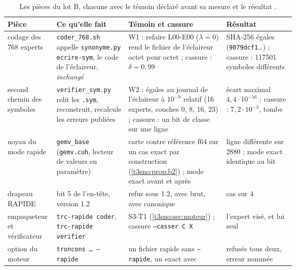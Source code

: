 \begin{table}[ht]
\centering\footnotesize
\caption[Les pièces du lot B et leurs témoins]{Les pièces du lot B, chacune avec le témoin déclaré avant sa mesure et le résultat \mes.}
\label{t3sno:tab:pieces}
\begin{tabularx}{\linewidth}{@{}>{\raggedright\arraybackslash}p{0.17\linewidth}>{\raggedright\arraybackslash}p{0.25\linewidth}>{\raggedright\arraybackslash}X>{\raggedright\arraybackslash}p{0.24\linewidth}@{}}
\toprule
Pièce & Ce qu'elle fait & Témoin et cassure & Résultat \\
\midrule
codage des 768 experts & \texttt{coder\_768.sh} appelle \texttt{synonyme.py ecrire-sym}, le code de l'éclaireur, \emph{inchangé} & W1 : refaire L00-E00 ($\lambda = 0$) rend le fichier de l'éclaireur octet pour octet ; cassure : $\delta = 0{,}99$ & SHA-256 égales (\texttt{9079dcf1}…) ; cassure : \num{117501} symboles différents \\
second chemin des symboles & \texttt{verifier\_sym.py} relit les \texttt{.sym}, reconstruit, recalcule les erreurs publiées & W2 : égales au journal de l'éclaireur à $10^{-9}$ relatif (16 experts, couches 0, 8, 16, 23) ; cassure : un bit de classe sur une ligne & écart maximal $4{,}4\cdot 10^{-16}$ ; cassure : $7{,}2\cdot 10^{-3}$, tombe \\
noyau du mode rapide & \texttt{gemv\_base} (\texttt{gemv.cuh}, lecteur de valeurs en paramètre) & carte contre référence f64 sur un cas exact par construction (\cref{t3sno:prop:b2}) ; mode exact avant et après & 0 ligne différente sur \num{2880} ; mode exact identique au bit \\
drapeau RAPIDE & bit 5 de l'en-tête, version 1.2 & refus sous 1.2, avec brut, avec canonique & 4 cas sur 4 \\
empaqueteur et vérificateur & \texttt{trc-rapide coder}, \texttt{trc-rapide verifier} & S3-T1 (\cref{t3sno:sec:moteur}) ; cassure \texttt{--casser C X} & l'expert visé, et lui seul \\
option du moteur & \texttt{troncons … --rapide} & un fichier rapide sans \texttt{--rapide}, un exact avec & refusés tous deux, erreur nommée \\
\bottomrule
\end{tabularx}
\end{table}

